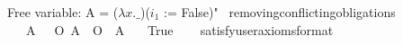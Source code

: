 \begin{isabellebody}
{  Free variable:
    A = ($\lambda x. \_$)($i_1$ := False)"%
}\isanewline
%
%
\endisatagproof
{\isafoldproof}%
%
\isadelimproof
%
\endisadelimproof
\isanewline
\isanewline
{}\isamarkupfalse%
\ removing{\isacharunderscore}conflicting{\isacharunderscore}obligations{\isacharcolon}\isanewline
\ \ \ {\isachardoublequoteopen}{\isasymforall}A{\isachardot}\ {\isasymTurnstile}\ {\isacharparenleft}\isactrlbold {\isasymnot}\ {\isacharparenleft}O\ {\isacharbraceleft}A{\isacharbraceright}\ \isactrlbold {\isasymand}\ O\ {\isacharbraceleft}\isactrlbold {\isasymnot}\ A{\isacharbraceright}{\isacharparenright}{\isacharparenright}{\isachardoublequoteclose}\isanewline
\ \ \ True\isanewline
\ \ \isamarkupfalse%
\ {\isacharbrackleft}satisfy{\isacharcomma}user{\isacharunderscore}axioms{\isacharcomma}format{\isacharequal}{}{\isacharbrackright}%
\isadelimproof
\ %
\endisadelimproof
%
\isatagproof
{}\isamarkupfalse%
\isanewline
%
\end{isabellebody}
